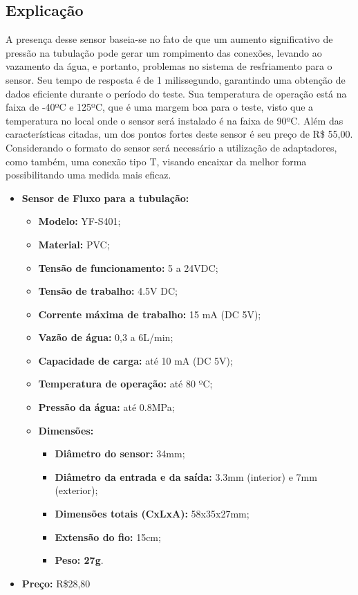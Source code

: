 \subsection{Explicação}
A presença desse sensor baseia-se no fato de que um aumento significativo de pressão na tubulação pode gerar um rompimento das conexões, levando ao vazamento da água, e portanto, problemas no sistema de  resfriamento para o sensor. Seu tempo de resposta é de 1 milissegundo, garantindo uma obtenção de dados eficiente durante o período do teste. Sua temperatura de operação está na faixa de -40ºC e 125ºC, que é uma margem boa para o teste, visto que a temperatura no local onde o sensor será instalado é na faixa de 90ºC. Além das características citadas, um dos pontos fortes deste sensor é seu preço de R\$ 55,00.
Considerando o formato do sensor será necessário a utilização de adaptadores, como também, uma conexão tipo T, visando encaixar da melhor forma possibilitando uma medida mais eficaz.\\
\begin{itemize}
	\item \textbf{Sensor de Fluxo para a tubulação:}
	\begin{itemize}
		\item \textbf{Modelo:} YF-S401;
		\item \textbf{Material:} PVC;
		\item \textbf{Tensão de funcionamento:} 5 a 24VDC;
		\item \textbf{Tensão de trabalho:} 4.5V DC;
		\item \textbf{Corrente máxima de trabalho:} 15 mA (DC 5V);
		\item \textbf{Vazão de água:} 0,3 a 6L/min;
		\item \textbf{Capacidade de carga:} até 10 mA (DC 5V);
		\item \textbf{Temperatura de operação:} até 80 ºC;
		\item \textbf{Pressão da água:} até 0.8MPa;
		\item \textbf{Dimensões:}
		\begin{itemize}
			\item \textbf{Diâmetro do sensor:} 34mm;
			\item \textbf{Diâmetro da entrada e da saída:} 3.3mm (interior)  e 7mm (exterior);
			\item \textbf{Dimensões totais (CxLxA):} 58x35x27mm;
			\item \textbf{Extensão do fio:} 15cm;
			\item \textbf{Peso: 27g}. 	
	\end{itemize}
	
	\end{itemize}
	
	\item \textbf{Preço:} R\$28,80
	
\end{itemize}
